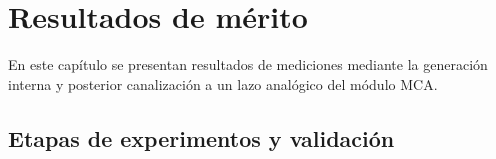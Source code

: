\chapter{Resultados de mérito}
\label{C:resultados}

\graphicspath{{figs/cap9/}{figs/comunes/}}

\begin{destacado}
En este capítulo se presentan resultados de mediciones mediante la generación
interna y posterior canalización a un lazo analógico del módulo MCA.
\end{destacado}

\section{Etapas de experimentos y validación}
\label{S:res-etapas-validacion}

